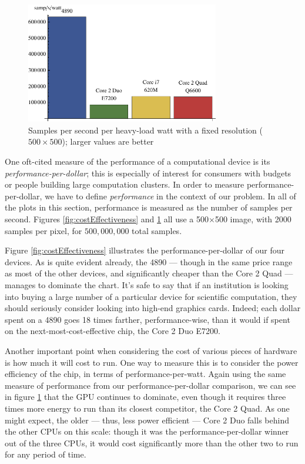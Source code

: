 \documentclass{acmsiggraph}
\begin{document}
\begin{figure}
    \includegraphics[width=84.5mm]{wattPlot.pdf}
    \caption{Samples per second per heavy-load watt with a fixed resolution ($500\times500$); larger values are better}
    \label{fig:wattPlot}
\end{figure}

One oft-cited measure of the performance of a computational device is its {\it performance-per-dollar}; this is especially of interest for consumers with budgets or people building large computation clusters. In order to measure performance-per-dollar, we have to define {\it performance} in the context of our problem. In all of the plots in this section, performance is measured as the number of samples per second. Figures \ref{fig:costEffectiveness} and \ref{fig:wattPlot} all use a 500$\times$500 image, with 2000 samples per pixel, for $500,000,000$ total samples.

Figure \ref{fig:costEffectiveness} illustrates the performance-per-dollar of our four devices. As is quite evident already, the 4890 --- though in the same price range as most of the other devices, and significantly cheaper than the Core 2 Quad --- manages to dominate the chart. It's safe to say that if an institution is looking into buying a large number of a particular device for scientific computation, they should seriously consider looking into high-end graphics cards. Indeed; each dollar spent on a 4890 goes 18 times farther, performance-wise, than it would if spent on the next-most-cost-effective chip, the Core 2 Duo E7200.

Another important point when considering the cost of various pieces of hardware is how much it will cost to run. One way to measure this is to consider the power efficiency of the chip, in terms of performance-per-watt. Again using the same measure of performance from our performance-per-dollar comparison, we can see in figure \ref{fig:wattPlot} that the GPU continues to dominate, even though it requires three times more energy to run than its closest competitor, the Core 2 Quad. As one might expect, the older --- thus, less power efficient --- Core 2 Duo falls behind the other CPUs on this scale: though it was the performance-per-dollar winner out of the three CPUs, it would cost significantly more than the other two to run for any period of time.
\end{document}
